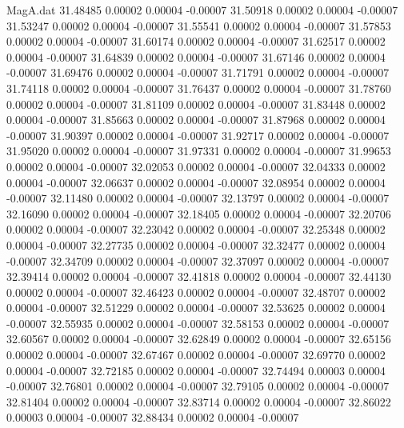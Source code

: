 \begin{filecontents}{MagA.dat}
  31.48485    0.00002    0.00004   -0.00007
  31.50918    0.00002    0.00004   -0.00007
  31.53247    0.00002    0.00004   -0.00007
  31.55541    0.00002    0.00004   -0.00007
  31.57853    0.00002    0.00004   -0.00007
  31.60174    0.00002    0.00004   -0.00007
  31.62517    0.00002    0.00004   -0.00007
  31.64839    0.00002    0.00004   -0.00007
  31.67146    0.00002    0.00004   -0.00007
  31.69476    0.00002    0.00004   -0.00007
  31.71791    0.00002    0.00004   -0.00007
  31.74118    0.00002    0.00004   -0.00007
  31.76437    0.00002    0.00004   -0.00007
  31.78760    0.00002    0.00004   -0.00007
  31.81109    0.00002    0.00004   -0.00007
  31.83448    0.00002    0.00004   -0.00007
  31.85663    0.00002    0.00004   -0.00007
  31.87968    0.00002    0.00004   -0.00007
  31.90397    0.00002    0.00004   -0.00007
  31.92717    0.00002    0.00004   -0.00007
  31.95020    0.00002    0.00004   -0.00007
  31.97331    0.00002    0.00004   -0.00007
  31.99653    0.00002    0.00004   -0.00007
  32.02053    0.00002    0.00004   -0.00007
  32.04333    0.00002    0.00004   -0.00007
  32.06637    0.00002    0.00004   -0.00007
  32.08954    0.00002    0.00004   -0.00007
  32.11480    0.00002    0.00004   -0.00007
  32.13797    0.00002    0.00004   -0.00007
  32.16090    0.00002    0.00004   -0.00007
  32.18405    0.00002    0.00004   -0.00007
  32.20706    0.00002    0.00004   -0.00007
  32.23042    0.00002    0.00004   -0.00007
  32.25348    0.00002    0.00004   -0.00007
  32.27735    0.00002    0.00004   -0.00007
  32.32477    0.00002    0.00004   -0.00007
  32.34709    0.00002    0.00004   -0.00007
  32.37097    0.00002    0.00004   -0.00007
  32.39414    0.00002    0.00004   -0.00007
  32.41818    0.00002    0.00004   -0.00007
  32.44130    0.00002    0.00004   -0.00007
  32.46423    0.00002    0.00004   -0.00007
  32.48707    0.00002    0.00004   -0.00007
  32.51229    0.00002    0.00004   -0.00007
  32.53625    0.00002    0.00004   -0.00007
  32.55935    0.00002    0.00004   -0.00007
  32.58153    0.00002    0.00004   -0.00007
  32.60567    0.00002    0.00004   -0.00007
  32.62849    0.00002    0.00004   -0.00007
  32.65156    0.00002    0.00004   -0.00007
  32.67467    0.00002    0.00004   -0.00007
  32.69770    0.00002    0.00004   -0.00007
  32.72185    0.00002    0.00004   -0.00007
  32.74494    0.00003    0.00004   -0.00007
  32.76801    0.00002    0.00004   -0.00007
  32.79105    0.00002    0.00004   -0.00007
  32.81404    0.00002    0.00004   -0.00007
  32.83714    0.00002    0.00004   -0.00007
  32.86022    0.00003    0.00004   -0.00007
  32.88434    0.00002    0.00004   -0.00007

\end{filecontents}
